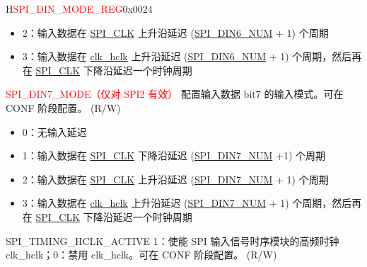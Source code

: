 \begin{register}{H}{\textcolor{red}{SPI\_DIN\_MODE\_REG}}{0x{}0024}
\begin{regdesc}
\begin{reglist}
\begin{itemize}
    \item 2：输入数据在 \hyperref[clk:SPICLK]{SPI\_CLK} 上升沿延迟 (\hyperref[fielddesc:SPIDIN0NUM]{SPI\_DIN6\_NUM} + 1) 个周期
    \item 3：输入数据在 \hyperref[clk:clkhclk]{clk\_hclk} 上升沿延迟 (\hyperref[fielddesc:SPIDIN0NUM]{SPI\_DIN6\_NUM} + 1) 个周期，然后再在 \hyperref[clk:SPICLK]{SPI\_CLK} 下降沿延迟一个时钟周期
\end{itemize}
\label{fielddesc:SPIDIN7MODE}\item [\textcolor{red}{SPI\_DIN7\_MODE（仅对 SPI2 有效）}] 配置输入数据 bit7 的输入模式。可在 CONF 阶段配置。 (R/W)
\begin{itemize}
    \item 0：无输入延迟
    \item 1：输入数据在 \hyperref[clk:SPICLK]{SPI\_CLK} 下降沿延迟 (\hyperref[fielddesc:SPIDIN0NUM]{SPI\_DIN7\_NUM} +1) 个周期
    \item 2：输入数据在 \hyperref[clk:SPICLK]{SPI\_CLK} 上升沿延迟 (\hyperref[fielddesc:SPIDIN0NUM]{SPI\_DIN7\_NUM} + 1) 个周期
    \item 3：输入数据在 \hyperref[clk:clkhclk]{clk\_hclk} 上升沿延迟 (\hyperref[fielddesc:SPIDIN0NUM]{SPI\_DIN7\_NUM} + 1) 个周期，然后再在 \hyperref[clk:SPICLK]{SPI\_CLK} 下降沿延迟一个时钟周期
\end{itemize}
\label{fielddesc:SPITIMINGHCLKACTIVE}\item [SPI\_TIMING\_HCLK\_ACTIVE] 1：使能 SPI 输入信号时序模块的高频时钟 clk\_hclk；0：禁用 clk\_hclk。可在 CONF 阶段配置。 (R/W)
\end{reglist}\end{regdesc}
\end{register}


